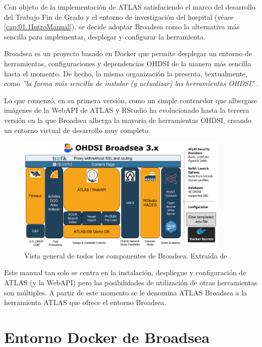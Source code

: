 Con objeto de la implementación de ATLAS satisfaciendo el marco del desarrollo del Trabajo Fin de Grado y el entorno de investigación del hospital (véase \ref{cap:01.1IntroManual}), se decide adoptar Broadsea como la alternativa más sencilla para implementar, desplegar y configurar la herramienta.

Broadsea es un proyecto basado en Docker que permite desplegar un entorno de herramientas, configuraciones y dependencias OHDSI de la manera más sencilla hasta el momento. De hecho, la misma organización la presenta, textualmente, como \textit{''la forma más sencilla de instalar (y actualizar) las herramientas OHDSI"} \cite{Broadsea3PDF}. 

Lo que comenzó, en su primera versión, como un simple contenedor que albergase imágenes de la WebAPI de ATLAS y RStudio \cite{Broadsea3PPTX} ha evolucionado hasta la tercera versión en la que Broadsea alberga la mayoría de herramientas OHDSI, creando un entorno virtual de desarrollo muy completo.

\begin{figure}[H]
    \centering
    \includegraphics[width=0.90\textwidth]{figures/OHDSIBroadsea3.0.png}
    \caption{Vista general de todos los componentes de Broadsea. Extraída de \cite{Broadsea3PPTX}.}
    \label{fig:OHDSIBroadsea3.0}
\end{figure}

Este manual tan solo se centra en la instalación, despliegue y configuración de ATLAS (y la WebAPI) pero las posibilidades de utilización de otras herramientas son múltiples. A partir de este momento se le denomina ATLAS Broadsea a la herramienta ATLAS que ofrece el entorno Broadsea.


\section{Entorno Docker de Broadsea} \label{cap:01.3Docker}

